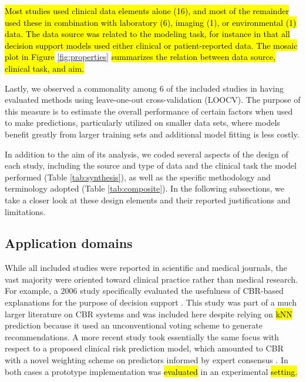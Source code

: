 \documentclass[sn-mathphys,Numbered,pdflatex]{sn-jnl}
\theoremstyle{remark}
\theoremstyle{definition}
\begin{document}
\hl{Most studies used clinical data elements alone
(16),
and most of the remainder used these in combination with laboratory
(6),
imaging
(1),
or environmental
(1)
data. The data source was related to the modeling task, for instance in that all decision support models used either clinical or patient-reported data.
The mosaic plot in Figure }\ref{fig:properties}\hl{ summarizes the relation between data source, clinical task, and aim.}

Lastly, we observed a commonality among 6 of the included studies in
having evaluated methods using leave-one-out cross-validation (LOOCV).
The purpose of this measure is to estimate the overall performance of
certain factors when used to make predictions, particularly utilized on
smaller data sets, where models benefit greatly from larger training
sets and additional model fitting is less costly.

In addition to the aim of its analysis, we coded several aspects of the
design of each study, including the source and type of data and the
clinical task the model performed (Table \ref{tab:synthesis}), as well
as the specific methodology and terminology adopted (Table
\ref{tab:composite}). In the following subsections, we take a closer
look at these design elements and their reported justifications and
limitations.

\subsection{Application domains}\label{application-domains}

While all included studies were reported in scientific and medical
journals, the vast majority were oriented toward clinical practice
rather than medical research. For example, a 2006 study specifically
evaluated the usefulness of CBR-based explanations for the purpose of
decision support \citep{Doyle2006}. This study was part of a much larger
literature on CBR systems and was included here despite relying on
\hl{kNN} prediction because it used an unconventional voting scheme to
generate recommendations. A more recent study took essentially the same
focus with respect to a proposed clinical risk prediction model, which
amounted to CBR with a novel weighting scheme on predictors informed by
expert consensus \citep{Fang2021}. In both cases a prototype
implementation was \hl{evaluated} in an experimental \hl{setting.}
\end{document}

